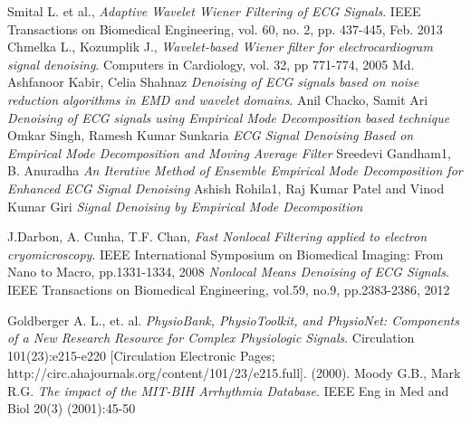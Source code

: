 \documentclass[a4paper]{article}
\begin{document}
\begin{thebibliography}{10}
	Smital L. et al., 
    \textit{Adaptive Wavelet Wiener Filtering of ECG Signals}. IEEE Transactions on Biomedical Engineering, vol. 60, no. 2, pp. 437-445, Feb. 2013
	Chmelka L., Kozumplik J., 
    \textit{Wavelet-based Wiener filter for electrocardiogram signal denoising}. Computers in Cardiology, vol. 32, pp 771-774, 2005  
	Md. Ashfanoor Kabir, Celia Shahnaz
	\textit{Denoising of ECG signals based on noise reduction algorithms in EMD and wavelet domains}. 
	Anil Chacko, Samit Ari 
	\textit{Denoising of ECG signals using Empirical Mode Decomposition based technique}
	Omkar Singh, Ramesh Kumar Sunkaria
	\textit{ECG Signal Denoising Based on Empirical Mode Decomposition and Moving Average Filter}
	Sreedevi Gandham1, B. Anuradha
	\textit{An Iterative Method of Ensemble Empirical Mode Decomposition for Enhanced ECG Signal Denoising}
	Ashish Rohila1, Raj Kumar Patel and Vinod Kumar Giri
	\textit{Signal Denoising by Empirical Mode Decomposition}

 J.Darbon, A. Cunha, T.F. Chan,
 	\textit{Fast Nonlocal Filtering applied to electron cryomicroscopy}. IEEE International Symposium on Biomedical Imaging: From Nano to Macro, pp.1331-1334, 2008
	\textit{Nonlocal Means Denoising of ECG Signals}. IEEE Transactions on Biomedical Engineering, vol.59, no.9, pp.2383-2386, 2012 


Goldberger A. L., et. al. \textit{PhysioBank, PhysioToolkit, and PhysioNet: Components of a New Research Resource for Complex Physiologic Signals}. Circulation 101(23):e215-e220 [Circulation Electronic Pages; http://circ.ahajournals.org/content/101/23/e215.full]. (2000).
Moody G.B., Mark R.G. \textit{The impact of the MIT-BIH Arrhythmia Database}. IEEE Eng in Med and Biol 20(3) (2001):45-50
    
\end{thebibliography}
\end{document}

